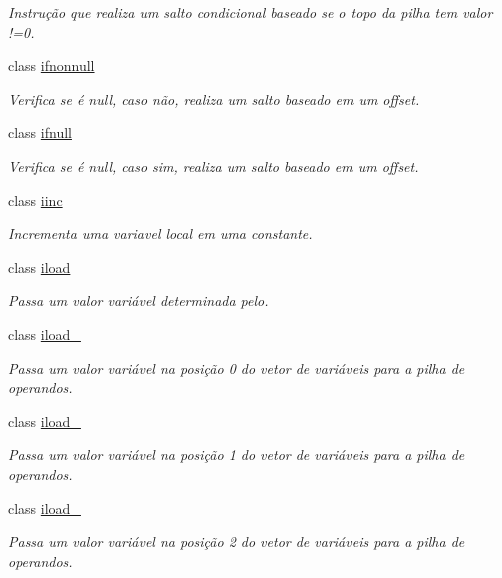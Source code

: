 \begin{DoxyCompactItemize}
\begin{DoxyCompactList}\small\item\em Instrução que realiza um salto condicional baseado se o topo da pilha tem valor !=0. \end{DoxyCompactList}\item 
class \hyperlink{class_instruction_impl_1_1ifnonnull}{ifnonnull}
\begin{DoxyCompactList}\small\item\em Verifica se é null, caso não, realiza um salto baseado em um offset. \end{DoxyCompactList}\item 
class \hyperlink{class_instruction_impl_1_1ifnull}{ifnull}
\begin{DoxyCompactList}\small\item\em Verifica se é null, caso sim, realiza um salto baseado em um offset. \end{DoxyCompactList}\item 
class \hyperlink{class_instruction_impl_1_1iinc}{iinc}
\begin{DoxyCompactList}\small\item\em Incrementa uma variavel local em uma constante. \end{DoxyCompactList}\item 
class \hyperlink{class_instruction_impl_1_1iload}{iload}
\begin{DoxyCompactList}\small\item\em Passa um valor variável determinada pelo. \end{DoxyCompactList}\item 
class \hyperlink{class_instruction_impl_1_1iload__0}{iload\+\_}
\begin{DoxyCompactList}\small\item\em Passa um valor variável na posição 0 do vetor de variáveis para a pilha de operandos. \end{DoxyCompactList}\item 
class \hyperlink{class_instruction_impl_1_1iload__1}{iload\+\_}
\begin{DoxyCompactList}\small\item\em Passa um valor variável na posição 1 do vetor de variáveis para a pilha de operandos. \end{DoxyCompactList}\item 
class \hyperlink{class_instruction_impl_1_1iload__2}{iload\+\_}
\begin{DoxyCompactList}\small\item\em Passa um valor variável na posição 2 do vetor de variáveis para a pilha de operandos. \end{DoxyCompactList}\item 

\end{DoxyCompactItemize}
